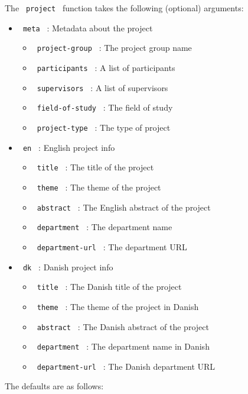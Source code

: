 The \texttt{\ project\ } function takes the following (optional)
arguments:

\begin{itemize}
\item
  \texttt{\ meta\ } : Metadata about the project

  \begin{itemize}
  \tightlist
  \item
    \texttt{\ project-group\ } : The project group name
  \item
    \texttt{\ participants\ } : A list of participants
  \item
    \texttt{\ supervisors\ } : A list of supervisors
  \item
    \texttt{\ field-of-study\ } : The field of study
  \item
    \texttt{\ project-type\ } : The type of project
  \end{itemize}
\item
  \texttt{\ en\ } : English project info

  \begin{itemize}
  \tightlist
  \item
    \texttt{\ title\ } : The title of the project
  \item
    \texttt{\ theme\ } : The theme of the project
  \item
    \texttt{\ abstract\ } : The English abstract of the project
  \item
    \texttt{\ department\ } : The department name
  \item
    \texttt{\ department-url\ } : The department URL
  \end{itemize}
\item
  \texttt{\ dk\ } : Danish project info

  \begin{itemize}
  \tightlist
  \item
    \texttt{\ title\ } : The Danish title of the project
  \item
    \texttt{\ theme\ } : The theme of the project in Danish
  \item
    \texttt{\ abstract\ } : The Danish abstract of the project
  \item
    \texttt{\ department\ } : The department name in Danish
  \item
    \texttt{\ department-url\ } : The Danish department URL
  \end{itemize}
\end{itemize}

The defaults are as follows:


